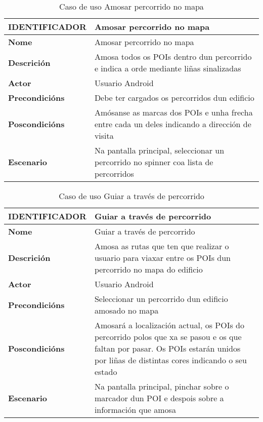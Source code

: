 \begin{table}[tbp]
	\begin{tabular}{|l|p{10cm}|}
		\hline 
		\textbf{IDENTIFICADOR}	& \textbf{Amosar percorrido no mapa} \\ 
		\hline 
		\textbf{Nome} & Amosar percorrido no mapa \\ 
		\hline 
		\textbf{Descrición} & Amosa todos os POIs dentro dun percorrido e indica a orde mediante liñas sinalizadas \\ 
		\hline 
		\textbf{Actor} & Usuario Android \\ 
		\hline 
		\textbf{Precondicións} & Debe ter cargados os percorridos dun edificio \\ 
		\hline 
		\textbf{Poscondicións} & Amósanse as marcas dos POIs e unha frecha entre cada un deles indicando a dirección de visita \\ 
		\hline 
		\textbf{Escenario} & Na pantalla principal, seleccionar un percorrido no spinner coa lista de percorridos \\ 
		\hline 
	\end{tabular}
	\caption{Caso de uso Amosar percorrido no mapa}
	\label{tab:cuAmosarPercorridoMapa}
\end{table}

\begin{table}[tbp]
	\begin{tabular}{|l|p{10cm}|}
		\hline 
		\textbf{IDENTIFICADOR}	& \textbf{Guiar a través de percorrido} \\ 
		\hline 
		\textbf{Nome} & Guiar a través de percorrido \\ 
		\hline 
		\textbf{Descrición} & Amosa as rutas que ten que realizar o usuario para viaxar entre os POIs dun percorrido no mapa do edificio \\ 
		\hline 
		\textbf{Actor} & Usuario Android \\ 
		\hline 
		\textbf{Precondicións} & Seleccionar un percorrido dun edificio amosado no mapa \\ 
		\hline 
		\textbf{Poscondicións} & Amosará a localización actual, os POIs do percorrido polos que xa se pasou e os que faltan por pasar. Os POIs estarán unidos por liñas de distintas cores indicando o seu estado \\ 
		\hline 
		\textbf{Escenario} & Na pantalla principal, pinchar sobre o marcador dun POI e despois sobre a información que amosa \\ 
		\hline 
	\end{tabular}
	\caption{Caso de uso Guiar a través de percorrido}
	\label{tab:cuGuiarPercorrido}
\end{table}

